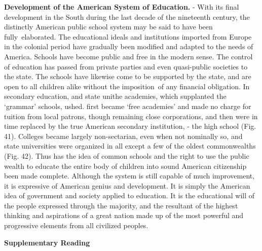 \documentclass[
]{book}
\begin{document}
\textbf{Development of the American System of Education.} - With its final development in the South during the last decade of the nineteenth century, the distinctly American public school system may be said to have been fully~elaborated. The educational ideals and institutions imported from Europe in the colonial period have gradually been modified and adapted to the needs of America. Schools have become public and free in the modern sense. The control of education has passed from private parties and even quasi-public societies to the state. The schools have likewise come to be supported by the state, and are open to all children alike without the imposition~of any financial obligation. In secondary education, and state unithe academies, which supplanted the `grammar' schools, ushed. first became `free academies' and made no charge for tuition from local patrons, though remaining close corporations, and then were in time replaced by the true American secondary institution, - the high school (Fig. 41). Colleges became largely non-sectarian, even when not nominally so, and state universities were organized in all except a few of the oldest commonwealths (Fig. 42). Thus has the idea of common schools and the right to use the public wealth to educate the entire body of children into sound American citizenship been made complete. Although the system is still capable of much improvement, it is expressive of American genius and development. It is simply the American idea of government and society applied to education. It is the educational will of the people expressed through the majority, and the resultant of the highest thinking and aspirations of a great nation made up of the most powerful and progressive elements from all civilized peoples.

\textbf{Supplementary Reading}
\end{document}
